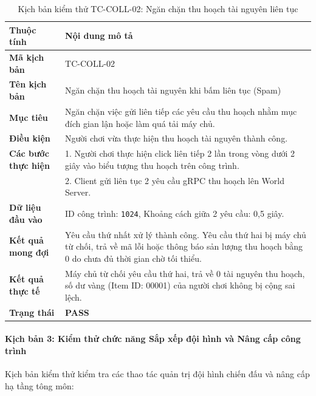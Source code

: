 \documentclass[../Project.tex]{subfiles}
\begin{document}
\begin{table}[H]
\centering
\begin{tabular}{|l|p{10.5cm}|}
\hline
\textbf{Thuộc tính} & \textbf{Nội dung mô tả} \\ \hline
\textbf{Mã kịch bản} & TC-COLL-02 \\ \hline
\textbf{Tên kịch bản} & Ngăn chặn thu hoạch tài nguyên khi bấm liên tục (Spam) \\ \hline
\textbf{Mục tiêu} & Ngăn chặn việc gửi liên tiếp các yêu cầu thu hoạch nhằm mục đích gian lận hoặc làm quá tải máy chủ. \\ \hline
\textbf{Điều kiện} & Người chơi vừa thực hiện thu hoạch tài nguyên thành công. \\ \hline
\textbf{Các bước thực hiện} & 
1. Người chơi thực hiện click liên tiếp 2 lần trong vòng dưới 2 giây vào biểu tượng thu hoạch trên công trình. \\
& 2. Client gửi liên tục 2 yêu cầu gRPC thu hoạch lên World Server. \\ \hline
\textbf{Dữ liệu đầu vào} & ID công trình: \texttt{1024}, Khoảng cách giữa 2 yêu cầu: 0,5 giây. \\ \hline
\textbf{Kết quả mong đợi} & Yêu cầu thứ nhất xử lý thành công. Yêu cầu thứ hai bị máy chủ từ chối, trả về mã lỗi hoặc thông báo sản lượng thu hoạch bằng 0 do chưa đủ thời gian chờ tối thiểu. \\ \hline
\textbf{Kết quả thực tế} & Máy chủ từ chối yêu cầu thứ hai, trả về 0 tài nguyên thu hoạch, số dư vàng (Item ID: 00001) của người chơi không bị cộng sai lệch. \\ \hline
\textbf{Trạng thái} & \textbf{PASS} \\ \hline
\end{tabular}
\caption{Kịch bản kiểm thử TC-COLL-02: Ngăn chặn thu hoạch tài nguyên liên tục}
\label{tab:tc_collect_02}
\end{table}

\paragraph{Kịch bản 3: Kiểm thử chức năng Sắp xếp đội hình và Nâng cấp công trình}
Kịch bản kiểm thử kiểm tra các thao tác quản trị đội hình chiến đấu và nâng cấp hạ tầng tông môn:
\end{document}
